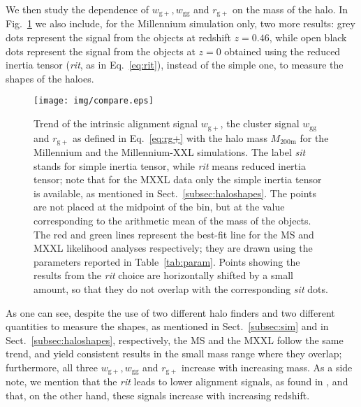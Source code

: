 \documentclass[a4paper,fleqn,usenatbib]{mnras}
\begin{document}
We then study the dependence of $w_{\mathrm{g+}}, w_{\mathrm{gg}}$ and $r_{\mathrm{g+}}$ on the mass of the halo. In Fig.~\ref{fig:vsmass} we also include, for the Millennium simulation only, two more results: grey dots represent the signal from the objects at redshift $z = 0.46$, while open black dots represent the signal from the objects at $z = 0$ obtained using the reduced inertia tensor (\textit{rit}, as in Eq.~\ref{eq:rit}), instead of the simple one, to measure the shapes of the haloes.
\begin{figure}
	\centerline{
	\texttt{[image: img/compare.eps]}}
	\caption{Trend of the intrinsic alignment signal $w_{\mathrm{g+}}$, the cluster signal $w_{\mathrm{gg}}$ and $r_{\mathrm{g+}}$ as defined in Eq.~\ref{eq:rg+} with the halo mass $M_{\mathrm{200m}}$ for the Millennium and the Millennium-XXL simulations. The label \textit{sit} stands for simple inertia tensor, while \textit{rit} means reduced inertia tensor; note that for the MXXL data only the simple inertia tensor is available, as mentioned in Sect.~\ref{subsec:haloshapes}. The points are not placed at the midpoint of the bin, but at the value corresponding to the arithmetic mean of the mass of the objects. The red and green lines represent the best-fit line for the MS and MXXL likelihood analyses respectively; they are drawn using the parameters reported in Table~\ref{tab:param}. Points showing the results from the \textit{rit} choice are horizontally shifted by a small amount, so that they do not overlap with the corresponding \textit{sit} dots.}
	\label{fig:vsmass}
\end{figure}
As one can see, despite the use of two different halo finders and two different quantities to measure the shapes, as mentioned in Sect.~\ref{subsec:sim} and in Sect.~\ref{subsec:haloshapes}, respectively, the MS and the MXXL follow the same trend, and yield consistent results in the small mass range where they overlap; furthermore, all three $w_{\mathrm{g+}}, w_{\mathrm{gg}}$ and $r_{\mathrm{g+}}$ increase with increasing mass. As a side note, we mention that the \textit{rit} leads to lower alignment signals, as found in \citet{Joachimietal2013b}, and that, on the other hand, these signals increase with increasing redshift. 
\end{document}
